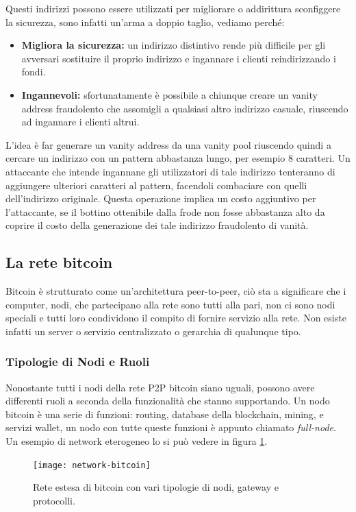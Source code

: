 Questi indirizzi possono essere utilizzati per migliorare o addirittura sconfiggere la sicurezza, sono infatti un'arma a doppio taglio, vediamo perché:
\begin{itemize}
	\item \textbf{Migliora la sicurezza:} un indirizzo distintivo rende più difficile per gli avversari sostituire il proprio indirizzo e ingannare i clienti reindirizzando i fondi.
	\item \textbf{Ingannevoli:} sfortunatamente è possibile a chiunque creare un vanity address fraudolento che assomigli a qualsiasi altro indirizzo casuale, riuscendo ad ingannare i clienti altrui.
\end{itemize}
L'idea è far generare un vanity address da una vanity pool riuscendo quindi a cercare un indirizzo con un pattern abbastanza lungo, per esempio 8 caratteri. Un attaccante che intende ingannane gli utilizzatori di tale indirizzo tenteranno di aggiungere ulteriori caratteri al pattern, facendoli combaciare con quelli dell'indirizzo originale. Questa operazione implica un costo aggiuntivo per l'attaccante, se il bottino ottenibile dalla frode non fosse abbastanza alto da coprire il costo della generazione dei tale indirizzo fraudolento di vanità.

\subsection{La rete bitcoin}
Bitcoin è strutturato come un'architettura peer-to-peer, ciò sta a significare che i computer, nodi, che partecipano alla rete sono tutti alla pari, non ci sono nodi speciali e tutti loro condividono il compito di fornire servizio alla rete. Non esiste infatti un server o servizio centralizzato o gerarchia di qualunque tipo.

\subsubsection{Tipologie di Nodi e Ruoli}
Nonostante tutti i nodi della rete P2P bitcoin siano uguali, possono avere differenti ruoli a seconda della funzionalità che stanno supportando. Un nodo bitcoin è una serie di funzioni: routing, database della blockchain, mining, e servizi wallet, un nodo con tutte queste funzioni è appunto chiamato \textit{full-node}. Un esempio di network eterogeneo lo si può vedere in figura \ref{fig:network-bitcoin}.
\begin{figure}
	\centering 
	\texttt{[image: network-bitcoin]} 
	\caption[Network bitcoin]{Rete estesa di bitcoin con vari tipologie di nodi, gateway e protocolli.}
	\label{fig:network-bitcoin} 
\end{figure}

